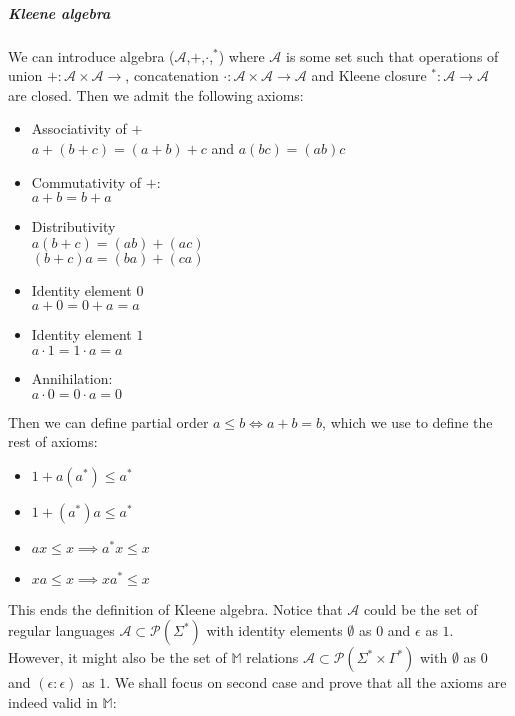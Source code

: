 \documentclass[12pt]{article}
\begin{document}
\subparagraph{Kleene algebra}

We can introduce algebra ($\mathcal{A}$,$+$,$\cdot$,$^*$) where $\mathcal{A}$ is some set such that operations of union $+:\mathcal{A}\times\mathcal{A}\rightarrow$, concatenation $\cdot:\mathcal{A}\times\mathcal{A}\rightarrow\mathcal{A}$ and Kleene closure $^*:\mathcal{A} \rightarrow \mathcal{A}$ are closed. Then we admit the following axioms:
\begin{itemize}
	\item Associativity of $+$ \\
	$a + (b + c) = (a + b) + c$ and $a(bc) = (ab)c$
	\item Commutativity of $+$: \\
	$a + b = b + a$
	\item Distributivity \\
	$a(b + c) = (ab) + (ac)$ \\
	$(b + c)a = (ba) + (ca)$
	\item Identity element $0$  \\
	$a + 0 = 0 + a = a$
	\item Identity element $1$  \\
	$a \cdot 1 = 1 \cdot a = a$  
	\item Annihilation: \\
	$a \cdot 0 = 0 \cdot a = 0$
\end{itemize}
Then we can define partial order $a \le b \iff  a+b = b$, which we use to define the rest of axioms:
\begin{itemize}
	\item $1 + a(a^*) \le a^*$ 
	\item $1 + (a^*)a \le a^*$
	\item $ax \le x\implies a^*x \le x$
	\item $xa \le x\implies xa^* \le x$
\end{itemize}
This ends the definition of Kleene algebra. Notice that  $\mathcal{A}$ could be the set of regular languages $\mathcal{A} \subset \mathcal{P}(\Sigma^*)$ with identity elements $\emptyset$ as $0$ and $\epsilon$ as $1$. However, it might also be the set of $\mathbb{ M}$ relations $\mathcal{A} \subset \mathcal{P}(\Sigma^* \times \Gamma^*)$ with $\emptyset$ as $0$ and $(\epsilon:\epsilon)$ as $1$. We shall focus on second case and prove that all the axioms are indeed valid in $\mathbb{ M}$: 
\end{document}
